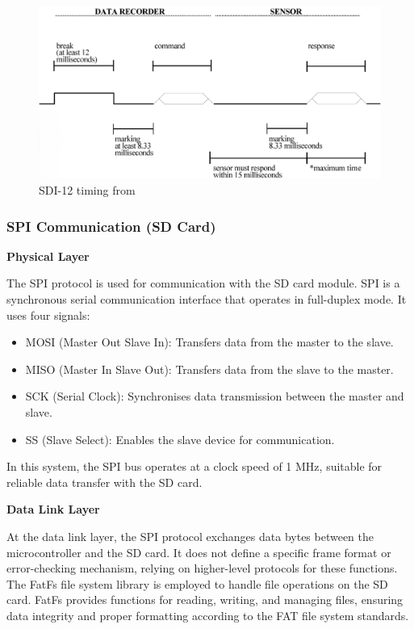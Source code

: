 \begin{figure}
    \includegraphics[width=\linewidth]{figures/SDI-12_timing.png}
    \caption{SDI-12 timing from \cite{sdi12_datasheet}}
    \label{sdi12_timing}
\end{figure}

\subsubsection{SPI Communication (SD Card)}

\textbf{Physical Layer}

The SPI protocol is used for communication with the SD card module. SPI is a synchronous serial communication 
interface that operates in full-duplex mode. It uses four signals:
\begin{itemize}
    \item MOSI (Master Out Slave In): Transfers data from the master to the slave.
    \item MISO (Master In Slave Out): Transfers data from the slave to the master.
    \item SCK (Serial Clock): Synchronises data transmission between the master and slave.
    \item SS (Slave Select): Enables the slave device for communication.
\end{itemize}
In this system, the SPI bus operates at a clock speed of 1 MHz, suitable for reliable data transfer 
with the SD card.

\textbf{Data Link Layer}

At the data link layer, the SPI protocol exchanges data bytes between the microcontroller 
and the SD card. It does not define a specific frame format or error-checking mechanism, relying on 
higher-level protocols for these functions. The FatFs file system library is employed to handle file 
operations on the SD card. FatFs provides functions for reading, writing, and managing files, ensuring 
data integrity and proper formatting according to the FAT file system standards.

